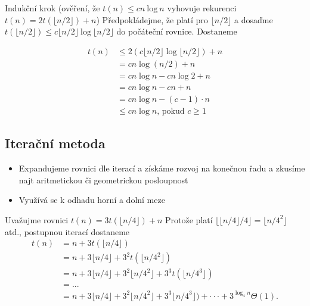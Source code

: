 \documentclass{szzclass}
\begin{document}
Indukční krok
(ověření, že $t(n) \leq cn~\text{log}~n$ vyhovuje rekurenci $t(n) = 2t(\lfloor n/2 \rfloor) + n$)
Předpokládejme, že platí pro $\lfloor n/2 \rfloor$ a dosaďme
$t(\lfloor n/2 \rfloor) \leq c \lfloor n/2 \rfloor~\text{log}~ \lfloor n/2 \rfloor$ do počáteční rovnice. Dostaneme



\begin{align*}
t(n) &\leq 2(c \lfloor n/2 \rfloor \log{\lfloor n/2 \rfloor}) + n\\
     &= cn \log{(n/2)} + n\\
     &= cn \log{ n} - cn \log{} 2 + n\\
     &= cn \log{ n} - cn + n\\
     &= cn \log{ n} - (c - 1)\cdot n\\
     &\leq cn\log{n}\text{, pokud }c \geq 1
\end{align*}



\subsection{Iterační metoda}

\begin{itemize}
    \item Expandujeme rovnici dle iterací a získáme rozvoj na konečnou řadu a zkusíme najt aritmetickou či geometrickou posloupnost
    \item Využívá se k odhadu horní a dolní meze
\end{itemize}

Uvažujme rovnici
$t(n) = 3t(\lfloor n/4\rfloor) + n$
Protože platí $\lfloor \lfloor n/4\rfloor /4\rfloor = \lfloor n/4^2 \rfloor$
atd., postupnou iterací dostaneme
\begin{align*}
t(n) &= n + 3t(\lfloor n/4 \rfloor)\\
     &= n + 3 \lfloor n/4\rfloor + 3^2t(\lfloor n/4^2 \rfloor)\\
     &= n + 3 \lfloor n/4 \rfloor + 3^2\lfloor n/4^2 \rfloor + 3^3t(\lfloor n/4^3 \rfloor)\\
     &= . . .\\
     &= n + 3 \lfloor n/4\rfloor + 3^2 \lfloor n/4^2 \rfloor + 3^3 \lfloor n/4^3 \rfloor) + · · · + 3^{\log_4 n} \Theta(1).
\end{align*}
\end{document}
